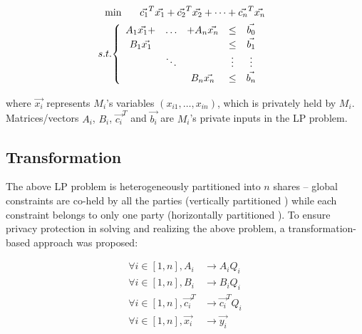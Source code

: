 \begin{equation}
\begin{gathered}
\min ~~~~~\vec{c_1}^T\vec{x_1}+\vec{c_2}^T\vec{x_2}+\dots+\vec{c_n}^T\vec{x_n}\\
s.t.{\centering
	\begin{cases}
	\begin{array}{ccc}
	A_1\vec{x_1}+& \ldots &+ A_n\vec{x_n} \\
	B_1\vec{x_1}&  & \\
	& \ddots&\\
	& & B_n\vec{x_n}\\
	\end{array}\begin{array}{c}
	\leq\\
	\leq\\
	\vdots\\
	\leq\\
	\end{array}
	\begin{array}{c}
	\vec{b_0}\\
	\vec{b_1}\\
	\vdots\\
	\vec{b_n}\\
	\end{array}
	\end{cases}}
\end{gathered}
\label{eq:std}
\end{equation}

where $\vec{x_i}$ represents $M_i$'s variables $(x_{i1},\dots, x_{in})$, which is privately held by $M_i$. Matrices/vectors $A_i$, $B_i$, $\vec{c_i}^T$ and $\vec{b_i}$ are $M_i$'s private inputs in the LP problem. 

\subsection{Transformation}

The above LP problem is heterogeneously partitioned into $n$ shares -- global constraints are co-held by all the parties (vertically partitioned \cite{HongJCS12,HongDBSEC14,HongThesis}) while each constraint belongs to only one party (horizontally partitioned \cite{HongOpt13,HongJIS14,HongTDSC15}). To ensure privacy protection in solving and realizing the above problem, a transformation-based approach \cite{HongIJER15} was proposed:

\begin{align}
\forall i\in[1,n], A_i&\longrightarrow A_iQ_i\nonumber\\
\forall i\in[1,n], B_i&\longrightarrow B_iQ_i\nonumber\\
\forall i\in[1,n], \vec{c_i}^T&\longrightarrow \vec{c_i}^TQ_i\nonumber\\
\forall i\in[1,n], \vec{x_i}&\longrightarrow \vec{y_i}
\label{eq:trans}  
\end{align}

